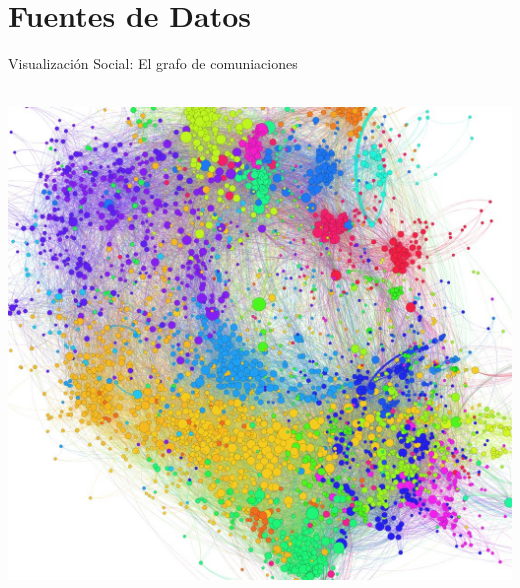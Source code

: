 \documentclass{beamer}
\begin{document}
%


\section{Fuentes de Datos}


\begin{frame}{Visualización Social: El grafo de comuniaciones}

	\center\
	\includegraphics[width = 1.0 \textwidth, trim = 0 0 0 0cm, clip = true]
	{slides/Graph-screenshot.jpg}

\end{frame}
\end{document}
